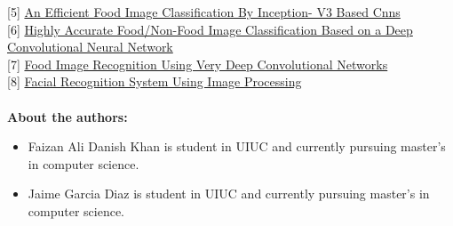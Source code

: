 \documentclass{IEEEtran}
\begin{document}
[5] \href{https://www.ijstr.org/final-print/mar2020/An-Efficient-Food-Image-Classification-By-Inception-v3-Based-Cnns.pdf}{An Efficient Food Image Classification By Inception- V3 Based Cnns}\\


[6] \href{https://link.springer.com/content/pdf/10.1007/978-3-319-23222-5_43.pdf}{Highly Accurate Food/Non-Food Image Classification Based on a Deep Convolutional Neural Network}\\

[7] \href{https://www.researchgate.net/publication/309128470_Food_Image_Recognition_Using_Very_Deep_Convolutional_Networks}{Food Image Recognition Using Very Deep Convolutional Networks}\\

[8] \href{https://www.ijert.org/research/human-face-recognition-using-image-processing-IJERTCONV2IS04051.pdf}{Facial Recognition System Using Image Processing}\\\\

\textbf{About the authors:}\\




\begin{itemize}
\item Faizan Ali Danish Khan is student in UIUC and currently pursuing master’s in computer science.\\

\item Jaime Garcia Diaz is student in UIUC and currently pursuing master’s in computer science.\\
\end{itemize}
\end{document}
